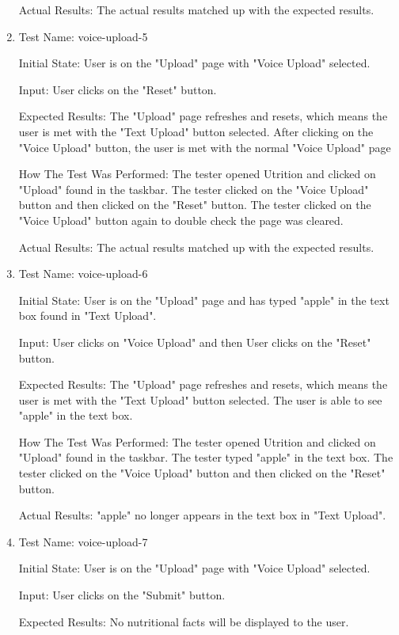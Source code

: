 \documentclass[12pt, titlepage]{article}
\begin{document}
\begin{enumerate}
		Actual Results: The actual results matched up with the expected results.
		
		\item{Test Name: voice-upload-5}
		
		Initial State: User is on the "Upload" page with "Voice Upload" selected.
		
		Input: User clicks on the "Reset" button.
		
		Expected Results: The "Upload" page refreshes and resets, which means the user is met with the "Text Upload" button selected. After clicking on the "Voice Upload" button, the user is met with the normal "Voice Upload" page
		
		How The Test Was Performed: The tester opened Utrition and clicked on "Upload" found in the taskbar. The tester clicked on the "Voice Upload" button and then clicked on the "Reset" button. The tester clicked on the "Voice Upload" button again to double check the page was cleared. 
		
		Actual Results: The actual results matched up with the expected results.
		
		\item{Test Name: voice-upload-6}
		
		Initial State: User is on the "Upload" page and has typed "apple" in the text box found in "Text Upload".
		
		Input: User clicks on "Voice Upload" and then User clicks on the "Reset" button.
		
		Expected Results: The "Upload" page refreshes and resets, which means the user is met with the "Text Upload" button selected. The user is able to see "apple" in the text box.
		
		How The Test Was Performed: The tester opened Utrition and clicked on "Upload" found in the taskbar. The tester typed "apple" in the text box. The tester clicked on the "Voice Upload" button and then clicked on the "Reset" button.
		
		Actual Results: "apple" no longer appears in the text box in "Text Upload".
		
		\item{Test Name: voice-upload-7}
		
		Initial State: User is on the "Upload" page with "Voice Upload" selected.
		
		Input: User clicks on the "Submit" button.
		
		Expected Results: No nutritional facts will be displayed to the user.
		

\end{enumerate}
\end{document}
